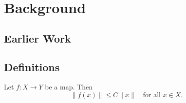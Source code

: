 \chapter{Background}
\label{ch:background}

\section{Earlier Work}
\lipsum[13-20]

\section{Definitions}
Let $f\colon X \to Y$ be a map. Then
\begin{equation}
  \lVert f(x) \rVert \le C \lVert x \rVert \quad \text{for all } x \in X.
\end{equation}
\lipsum[21-24]
